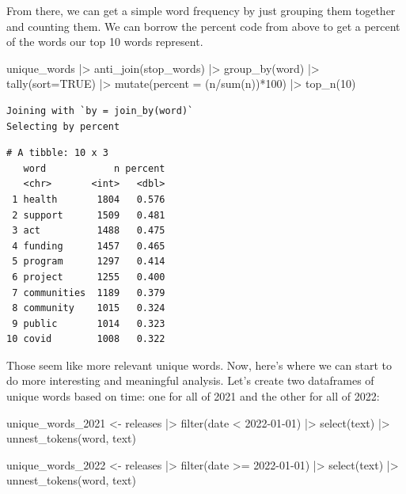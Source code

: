 \documentclass[
  letterpaper,
  DIV=11,
  numbers=noendperiod]{scrreprt}
\newenvironment{Shaded}{\begin{snugshade}}{\end{snugshade}}
\newcommand{\AttributeTok}[1]{\textcolor[rgb]{0.40,0.45,0.13}{#1}}
\newcommand{\ConstantTok}[1]{\textcolor[rgb]{0.56,0.35,0.01}{#1}}
\newcommand{\DecValTok}[1]{\textcolor[rgb]{0.68,0.00,0.00}{#1}}
\newcommand{\FunctionTok}[1]{\textcolor[rgb]{0.28,0.35,0.67}{#1}}
\newcommand{\NormalTok}[1]{\textcolor[rgb]{0.00,0.23,0.31}{#1}}
\newcommand{\OtherTok}[1]{\textcolor[rgb]{0.00,0.23,0.31}{#1}}
\newcommand{\SpecialCharTok}[1]{\textcolor[rgb]{0.37,0.37,0.37}{#1}}
\newcommand{\StringTok}[1]{\textcolor[rgb]{0.13,0.47,0.30}{#1}}
\begin{document}
From there, we can get a simple word frequency by just grouping them
together and counting them. We can borrow the percent code from above to
get a percent of the words our top 10 words represent.

\begin{Shaded}
\begin{Highlighting}[]
\NormalTok{unique\_words }\SpecialCharTok{|\textgreater{}}
  \FunctionTok{anti\_join}\NormalTok{(stop\_words) }\SpecialCharTok{|\textgreater{}}
  \FunctionTok{group\_by}\NormalTok{(word) }\SpecialCharTok{|\textgreater{}}
  \FunctionTok{tally}\NormalTok{(}\AttributeTok{sort=}\ConstantTok{TRUE}\NormalTok{) }\SpecialCharTok{|\textgreater{}}
  \FunctionTok{mutate}\NormalTok{(}\AttributeTok{percent =}\NormalTok{ (n}\SpecialCharTok{/}\FunctionTok{sum}\NormalTok{(n))}\SpecialCharTok{*}\DecValTok{100}\NormalTok{) }\SpecialCharTok{|\textgreater{}}
  \FunctionTok{top\_n}\NormalTok{(}\DecValTok{10}\NormalTok{)}
\end{Highlighting}
\end{Shaded}

\begin{verbatim}
Joining with `by = join_by(word)`
Selecting by percent
\end{verbatim}

\begin{verbatim}
# A tibble: 10 x 3
   word            n percent
   <chr>       <int>   <dbl>
 1 health       1804   0.576
 2 support      1509   0.481
 3 act          1488   0.475
 4 funding      1457   0.465
 5 program      1297   0.414
 6 project      1255   0.400
 7 communities  1189   0.379
 8 community    1015   0.324
 9 public       1014   0.323
10 covid        1008   0.322
\end{verbatim}

Those seem like more relevant unique words. Now, here's where we can
start to do more interesting and meaningful analysis. Let's create two
dataframes of unique words based on time: one for all of 2021 and the
other for all of 2022:

\begin{Shaded}
\begin{Highlighting}[]
\NormalTok{unique\_words\_2021 }\OtherTok{\textless{}{-}}\NormalTok{ releases }\SpecialCharTok{|\textgreater{}}
  \FunctionTok{filter}\NormalTok{(date }\SpecialCharTok{\textless{}} \StringTok{\textquotesingle{}2022{-}01{-}01\textquotesingle{}}\NormalTok{) }\SpecialCharTok{|\textgreater{}}
  \FunctionTok{select}\NormalTok{(text) }\SpecialCharTok{|\textgreater{}}
  \FunctionTok{unnest\_tokens}\NormalTok{(word, text)}

\NormalTok{unique\_words\_2022 }\OtherTok{\textless{}{-}}\NormalTok{ releases }\SpecialCharTok{|\textgreater{}}
  \FunctionTok{filter}\NormalTok{(date }\SpecialCharTok{\textgreater{}=} \StringTok{\textquotesingle{}2022{-}01{-}01\textquotesingle{}}\NormalTok{) }\SpecialCharTok{|\textgreater{}}
  \FunctionTok{select}\NormalTok{(text) }\SpecialCharTok{|\textgreater{}}
  \FunctionTok{unnest\_tokens}\NormalTok{(word, text)}
\end{Highlighting}
\end{Shaded}
\end{document}
